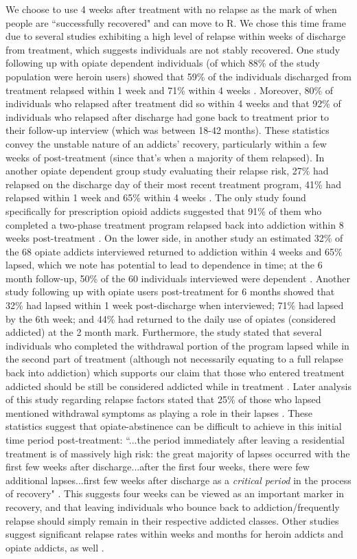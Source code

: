 \documentclass[12pt]{article}
\begin{document}
We choose to use 4 weeks after treatment with no relapse as the mark of when people are ``successfully recovered" and can move to R. We chose this time frame due to several studies exhibiting a high level of relapse within weeks of discharge from treatment, which suggests individuals are not stably recovered. One study following up with opiate dependent individuals (of which 88\% of the study population were heroin users) showed that 59\% of the individuals discharged from treatment relapsed within 1 week and 71\% within 4 weeks \cite{Smyth}. Moreover, 80\% of individuals who relapsed after treatment did so within 4 weeks and that 92\% of individuals who relapsed after discharge had gone back to treatment prior to their follow-up interview (which was between 18-42 months). These statistics convey the unstable nature of an addicts' recovery, particularly within a few weeks of post-treatment (since that's when a majority of them relapsed). In another opiate dependent group study evaluating their relapse risk, 27\% had relapsed on the discharge day of their most recent treatment program, 41\% had relapsed within 1 week and 65\% within 4 weeks \cite{Bailey}. The only study found specifically for prescription opioid addicts suggested that 91\% of them who completed a two-phase treatment program relapsed back into addiction within 8 weeks post-treatment \cite{Weiss}. On the lower side, in another study an estimated 32\% of the 68 opiate addicts interviewed returned to addiction within 4 weeks and 65\% lapsed, which we note has potential to lead to dependence in time; at the 6 month follow-up, 50\% of the 60 individuals interviewed were dependent \cite{Broers}. Another study following up with opiate users post-treatment for 6 months showed that 32\% had lapsed within 1 week post-discharge when interviewed; 71\% had lapsed by the 6th week; and 44\% had returned to the daily use of opiates (considered addicted) at the 2 month mark. Furthermore, the study stated that several individuals who completed the withdrawal portion of the program lapsed while in the second part of treatment (although not necessarily equating to a full relapse back into addiction) which supports our claim that those who entered treatment addicted should be still be considered addicted while in treatment \cite{Gossop1}. Later analysis of this study regarding relapse factors stated that 25\% of those who lapsed mentioned withdrawal symptoms as playing a role in their lapses \cite{Gossop2}. These statistics suggest that opiate-abstinence can be difficult to achieve in this initial time period post-treatment: ``...the period immediately after leaving a residential treatment is of massively high risk: the great majority of lapses occurred with the first few weeks after discharge...after the first four weeks, there were few additional lapses...first few weeks after discharge as a \textit{critical period} in the process of recovery" \cite{Gossop1}. This suggests four weeks can be viewed as an important marker in recovery, and that leaving individuals who bounce back to addiction/frequently relapse should simply remain in their respective addicted classes. Other studies suggest significant relapse rates within weeks and months for heroin addicts and opiate addicts, as well \cite{Hunt}. \\
\end{document}
